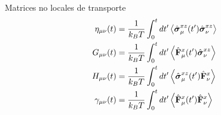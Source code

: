 \documentclass{beamer}
\begin{document}
\begin{frame}{Matrices no locales de transporte} 
\begin{align}
\eta_{\mu\nu}(t)
&=\frac{1}{k_BT}\int_0^t dt'
\left\langle \hat{\boldsymbol{\sigma}}^{xz}_{\mu}(t')\hat{\boldsymbol{\sigma}}^{xz}_{\nu}
\right\rangle
\nonumber\\
  G_{\mu\nu}(t)&=\frac{1}{k_BT}\int_0^t dt'
\left\langle\hat{\bf F}^x_\mu(t')
\hat{\boldsymbol{\sigma}}^{xz}_\nu
\right\rangle
\nonumber\\
H_{\mu\nu}(t)&=
\frac{1}{k_BT}\int_0^t dt'
\left\langle\hat{\boldsymbol{\sigma}}^{xz}_\mu(t')\hat{\bf F}^{x}_\nu\right\rangle
\nonumber\\
  \gamma_{\mu\nu}(t)
&=\frac{1}{k_BT}\int_0^t dt'
\left\langle 
\hat{\bf F}^{x}_\mu(t')
\hat{\bf F}^{x}_\nu\right\rangle
\nonumber
\end{align}
\end{frame}









\end{document}
